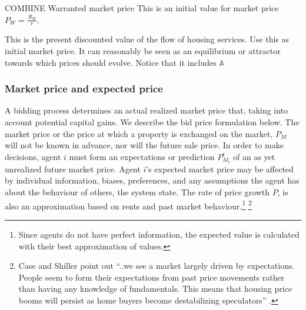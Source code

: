COMBINE {Warranted market price}  
This is  an initial value for market price 
 $P_W=\frac{\mathcal{R}_W }{r}$,  

This is the present discounted value of the flow of housing services.  Use this as initial market price.  It can reasonably be seen as an equilibrium or attractor towards which prices should  evolve.  Notice that it includes $\mathbb{A}$


\subsubsection{Market price and expected price} \label{section-market-price}

A bidding process determines an actual realized market price that, taking into account potential capital gains. We describe the bid price formulation below. The \gls{market price} or the price at which a property is exchanged on the market, $P_M$ will not be known in advance, nor will the future sale price. In order to make decisions, agent $i$ must form an \glspl{expectation} or prediction $P_{M_i}^{\epsilon}$ of an as yet unrealized future market price. Agent $i$'s expected market price may be affected by individual information, biases, preferences, and any assumptions the agent has about the behaviour of others, the system state. The rate of price growth $\dot P$, is also an approximation based on rents and past market behaviour.\footnote{Since agents do not have perfect information, the expected value is calculated with their best approximation of values.} 
 \footnote{Case and Shiller point out ``..we see a market largely driven by expectations. People seem to form their expectations from past price movements rather than having any knowledge of fundamentals. This means that housing price booms will persist as home buyers become destabilizing speculators''  \cite{caseThereBubbleHousing2003}.} 




